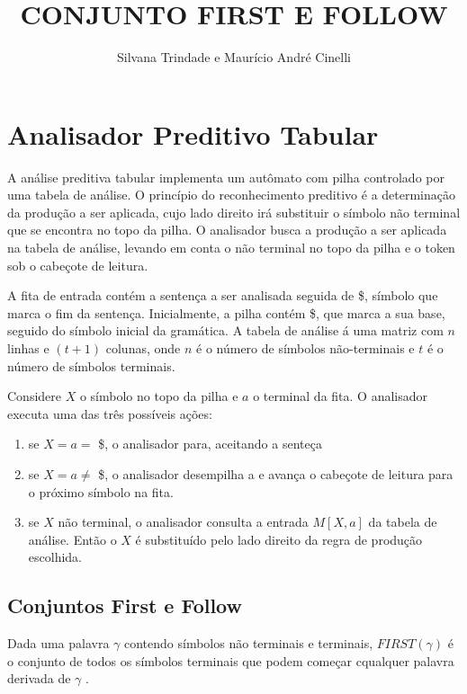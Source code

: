 \documentclass[10pt,a4paper,titlepage]{hitec}
\author{Silvana Trindade e Maurício André Cinelli}
\title{CONJUNTO FIRST E FOLLOW }
\begin{document}
\maketitle

\section*{Analisador Preditivo Tabular}
A análise preditiva tabular implementa um autômato com pilha controlado por uma tabela de análise. 
O princípio do reconhecimento preditivo é a determinação da produção a ser aplicada, cujo lado direito irá substituir o símbolo não terminal que se encontra no topo da pilha. 
O analisador busca a produção a ser aplicada na tabela de análise, levando em conta o não terminal no topo da pilha e o token sob o cabeçote de leitura.

A fita de entrada contém a sentença a ser analisada seguida de \$, símbolo que marca o fim da sentença.
Inicialmente, a pilha contém \$, que marca a sua base, seguido do símbolo inicial da gramática.
A tabela de análise á uma matriz com $n$ linhas e $(t + 1)$ colunas, onde $n$ é o número de símbolos não-terminais e $t$ é o número de símbolos terminais.

Considere $X$ o símbolo no topo da pilha e $a$ o terminal da fita.
O analisador executa uma das três possíveis ações:

\begin{enumerate}
\item se $X = a = $ \$, o analisador para, aceitando a senteça
\item se $X = a \neq$  \$, o analisador desempilha a e avança o cabeçote de leitura para o próximo símbolo na fita.
\item se $X$ não terminal, o analisador consulta a entrada $M[X,a]$ da tabela de análise.
 Então o $X$ é substituído pelo lado direito da regra de produção escolhida.
\end{enumerate}

\subsection*{Conjuntos First e Follow}
Dada uma palavra $\gamma$ contendo símbolos não terminais e terminais, $FIRST(\gamma)$ é o conjunto de todos os símbolos terminais que podem começar cqualquer palavra derivada de $\gamma$ .
\end{document}

